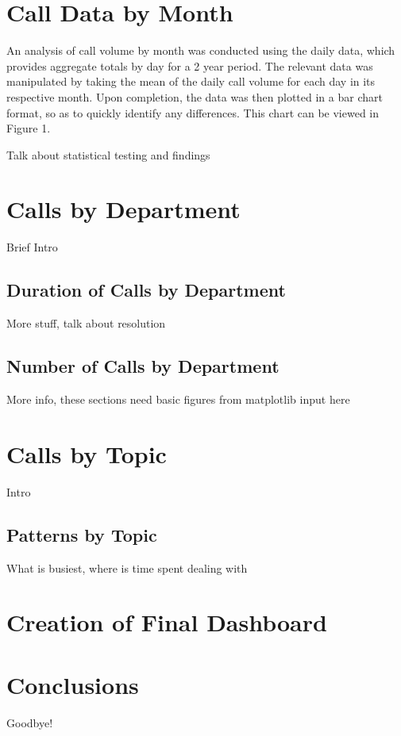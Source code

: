 \documentclass[11pt,twocolumn]{article}
\begin{document}
\section{Call Data by Month}
An analysis of call volume by month was conducted using the daily data, which provides aggregate totals by day for a 2 year period. The relevant data was manipulated by taking the mean of the daily call volume for each day in its respective month.  Upon completion, the data was then plotted in a bar chart format, so as to quickly identify any differences.  This chart can be viewed in Figure 1.
\par
Talk about statistical testing and findings

\section{Calls by Department}
Brief Intro
\subsection{Duration of Calls by Department}
More stuff, talk about resolution
\subsection{Number of Calls by Department}
More info, these sections need basic figures from matplotlib input here

\section{Calls by Topic}
Intro
\subsection{Patterns by Topic}
What is busiest, where is time spent dealing with 


\section{Creation of Final Dashboard}

\section{Conclusions}

Goodbye!
\end{document}
